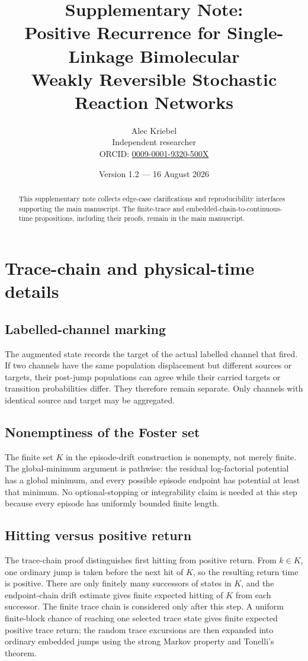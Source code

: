 \documentclass[10pt]{article}
\title{\bfseries Supplementary Note:\\[0.25em]
Positive Recurrence for Single-Linkage Bimolecular\\
Weakly Reversible Stochastic Reaction Networks}
\author{Alec Kriebel\\[0.2em]
\small Independent researcher\\
\small ORCID: \href{https://orcid.org/0009-0001-9320-500X}{0009-0001-9320-500X}}
\date{Version 1.2 --- 16 August 2026}
\begin{document}
\maketitle

\begin{abstract}
This supplementary note collects edge-case clarifications and reproducibility
interfaces supporting the main manuscript.  The finite-trace and
embedded-chain-to-continuous-time propositions, including their proofs, remain
in the main manuscript.
\end{abstract}

\section{Trace-chain and physical-time details}

\subsection{Labelled-channel marking}

The augmented state records the target of the actual labelled channel that
fired.  If two channels have the same population displacement but different
sources or targets, their post-jump populations can agree while their carried
targets or transition probabilities differ.  They therefore remain separate.
Only channels with identical source and target may be aggregated.

\subsection{Nonemptiness of the Foster set}

The finite set $K$ in the episode-drift construction is nonempty, not merely
finite.  The global-minimum argument is pathwise: the residual log-factorial
potential has a global minimum, and every possible episode endpoint has
potential at least that minimum.  No optional-stopping or integrability claim
is needed at this step because every episode has uniformly bounded finite
length.

\subsection{Hitting versus positive return}

The trace-chain proof distinguishes first hitting from positive return.  From
$k\in K$, one ordinary jump is taken before the next hit of $K$, so the
resulting return time is positive.  There are only finitely many successors of
states in $K$, and the endpoint-chain drift estimate gives finite expected
hitting of $K$ from each successor.  The finite trace chain is considered only
after this step.  A uniform finite-block chance of reaching one selected trace
state gives finite expected positive trace return; the random trace excursions
are then expanded into ordinary embedded jumps using the strong Markov
property and Tonelli's theorem.
\end{document}
